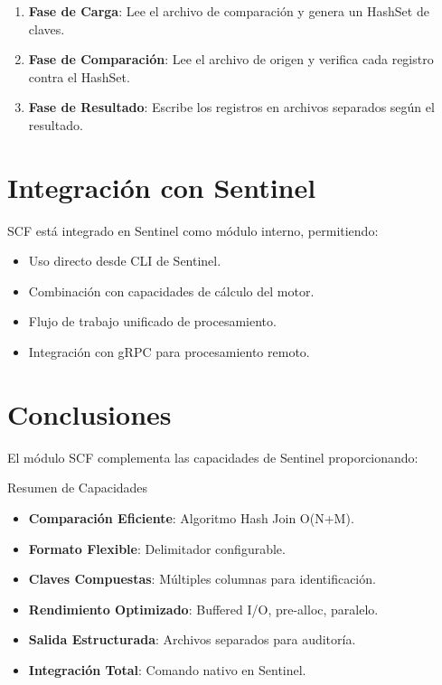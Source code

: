 \begin{enumerate}
\item \textbf{Fase de Carga}: Lee el archivo de comparación y genera un HashSet de claves.
\item \textbf{Fase de Comparación}: Lee el archivo de origen y verifica cada registro contra el HashSet.
\item \textbf{Fase de Resultado}: Escribe los registros en archivos separados según el resultado.
\end{enumerate}


\section{Integración con Sentinel}

SCF está integrado en Sentinel como módulo interno, permitiendo:

\begin{itemize}
\item Uso directo desde CLI de Sentinel.
\item Combinación con capacidades de cálculo del motor.
\item Flujo de trabajo unificado de procesamiento.
\item Integración con gRPC para procesamiento remoto.
\end{itemize}


\section{Conclusiones}

El módulo SCF complementa las capacidades de Sentinel proporcionando:

\begin{caja}{Resumen de Capacidades}
\begin{itemize}
\item \textbf{Comparación Eficiente}: Algoritmo Hash Join O(N+M).
\item \textbf{Formato Flexible}: Delimitador configurable.
\item \textbf{Claves Compuestas}: Múltiples columnas para identificación.
\item \textbf{Rendimiento Optimizado}: Buffered I/O, pre-alloc, paralelo.
\item \textbf{Salida Estructurada}: Archivos separados para auditoría.
\item \textbf{Integración Total}: Comando nativo en Sentinel.
\end{itemize}
\end{caja}

